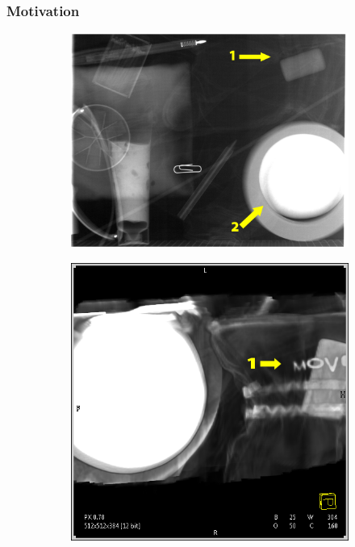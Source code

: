 \begin{frame}
	\frametitle{Motivation}
	\begin{figure}[tb]
		\centering
		\begin{subfigure}[t]{0.375\linewidth}
			\includegraphics[width=\linewidth]{images/box_ann}
			\caption{}
			\label{fig:ct_mot_1.1}
		\end{subfigure}
		\begin{subfigure}[t]{0.29\linewidth}
			\includegraphics[width=\linewidth]{images/box_move}

\end{subfigure}
\end{figure}
\end{frame}
